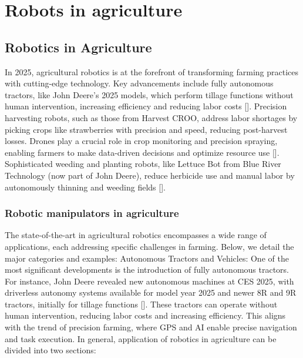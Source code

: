 \chapter{Robots in agriculture}
\section{Robotics in Agriculture}
In 2025, agricultural robotics is at the forefront of transforming farming practices with cutting-edge technology. Key advancements include fully autonomous tractors, like John Deere's 2025 models, which perform tillage functions without human intervention, increasing efficiency and reducing labor costs [\cite{DeereCES2025}]. Precision harvesting robots, such as those from Harvest CROO, address labor shortages by picking crops like strawberries with precision and speed, reducing post-harvest losses. Drones play a crucial role in crop monitoring and precision spraying, enabling farmers to make data-driven decisions and optimize resource use [\cite{BuiltInAgRobots}]. Sophisticated weeding and planting robots, like Lettuce Bot from Blue River Technology (now part of John Deere), reduce herbicide use and manual labor by autonomously thinning and weeding fields [\cite{Robovision2025}]. 

\subsection{Robotic manipulators in agriculture}
The state-of-the-art in agricultural robotics encompasses a wide range of applications, each addressing specific challenges in farming. Below, we detail the major categories and examples:
Autonomous Tractors and Vehicles:
One of the most significant developments is the introduction of fully autonomous tractors. For instance, John Deere revealed new autonomous machines at CES 2025, with driverless autonomy systems available for model year 2025 and newer 8R and 9R tractors, initially for tillage functions [\cite{DeereCES2025}]. These tractors can operate without human intervention, reducing labor costs and increasing efficiency. This aligns with the trend of precision farming, where GPS and AI enable precise navigation and task execution. In general, application of robotics in agriculture can be divided into two sections:






